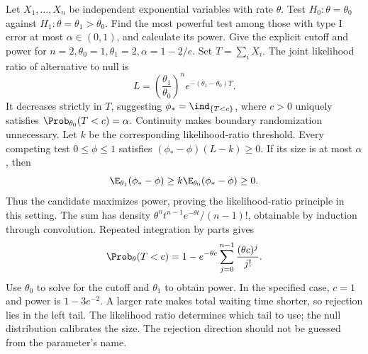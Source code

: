 Let $X_1,\ldots,X_n$ be independent exponential variables with rate $\theta$. Test $H_0:\theta=\theta_0$ against $H_1:\theta=\theta_1>\theta_0$. Find the most powerful test among those with type I error at most $\alpha\in(0,1)$, and calculate its power. Give the explicit cutoff and power for $n=2,\theta_0=1,\theta_1=2,\alpha=1-2/e$.
\solution Set $T=\sum_iX_i$. The joint likelihood ratio of alternative to null is
\[
 L=\left(\frac{\theta_1}{\theta_0}\right)^n
      e^{-(\theta_1-\theta_0)T}.
\]
It decreases strictly in $T$, suggesting $\phi_*=\ind_{\{T<c\}}$, where $c>0$ uniquely satisfies $\Prob_{\theta_0}(T<c)=\alpha$. Continuity makes boundary randomization unnecessary.
Let $k$ be the corresponding likelihood-ratio threshold. Every competing test $0\le\phi\le1$ satisfies $(\phi_* -\phi)(L-k)\ge0$. If its size is at most $\alpha$, then
\[
 \E_{\theta_1}(\phi_* -\phi)
 \ge k\E_{\theta_0}(\phi_* -\phi)\ge0.
\]
Thus the candidate maximizes power, proving the likelihood-ratio principle in this setting.
The sum has density $\theta^nt^{n-1}e^{-\theta t}/(n-1)!$, obtainable by induction through convolution. Repeated integration by parts gives
\[
 \Prob_\theta(T<c)=1-e^{-\theta c}
       \sum_{j=0}^{n-1}\frac{(\theta c)^j}{j!}.
\]
Use $\theta_0$ to solve for the cutoff and $\theta_1$ to obtain power. In the specified case, $c=1$ and power is $1-3e^{-2}$. A larger rate makes total waiting time shorter, so rejection lies in the left tail.
\insight The likelihood ratio determines which tail to use; the null distribution calibrates the size. The rejection direction should not be guessed from the parameter's name.

